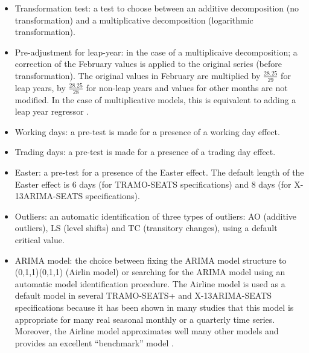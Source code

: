 \documentclass[article]{jss}
\providecommand{\tightlist}{%
  \setlength{\itemsep}{0pt}\setlength{\parskip}{0pt}}
\begin{document}
\begin{itemize}
\tightlist
\item
  Transformation test: a test to choose between an additive
  decomposition (no transformation) and a multiplicative decomposition
  (logarithmic transformation).\\
\item
  Pre-adjustment for leap-year: in the case of a multiplicaive
  decomposition; a correction of the February values is applied to the
  original series (before transformation). The original values in
  February are multiplied by \(\frac{28.25}{29}\) for leap years, by
  \(\frac{28.25}{28}\) for non-leap years and values for other months
  are not modified. In the case of multiplicative models, this is
  equivalent to adding a leap year regressor
  \citep{bell1992lengthmonthadj}.
\item
  Working days: a pre-test is made for a presence of a working day
  effect.\\
\item
  Trading days: a pre-test is made for a presence of a trading day
  effect.\\
\item
  Easter: a pre-test for a presence of the Easter effect. The default
  length of the Easter effect is 6 days (for TRAMO-SEATS specifications)
  and 8 days (for X-13ARIMA-SEATS specifications).\\
\item
  Outliers: an automatic identification of three types of outliers: AO
  (additive outliers), LS (level shifts) and TC (transitory changes),
  using a default critical value.\\
\item
  ARIMA model: the choice between fixing the ARIMA model structure to
  (0,1,1)(0,1,1) (Airlin model) or searching for the ARIMA model using
  an automatic model identification procedure. The Airline model is used
  as a default model in several TRAMO-SEATS+ and X-13ARIMA-SEATS
  specifications because it has been shown in many studies that this
  model is appropriate for many real seasonal monthly or a quarterly
  time series. Moreover, the Airline model approximates well many other
  models and provides an excellent ``benchmark'' model
  \citep{maravall2009identification}.
\end{itemize}
\end{document}
